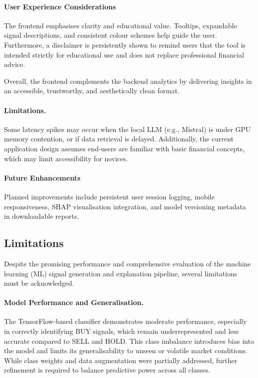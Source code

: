 \FloatBarrier

\paragraph{User Experience Considerations}
The frontend emphasises clarity and educational value. Tooltips, expandable signal descriptions, and consistent colour schemes help guide the user. Furthermore, a disclaimer is persistently shown to remind users that the tool is intended strictly for educational use and does not replace professional financial advice.

Overall, the frontend complements the backend analytics by delivering insights in an accessible, trustworthy, and aesthetically clean format.

\paragraph{Limitations.}  
Some latency spikes may occur when the local LLM (e.g., Mistral) is under GPU memory contention, or if data retrieval is delayed. Additionally, the current application design assumes end-users are familiar with basic financial concepts, which may limit accessibility for novices.

\paragraph{Future Enhancements}  
Planned improvements include persistent user session logging, mobile responsiveness, SHAP visualisation integration, and model versioning metadata in downloadable reports.

\subsection{Limitations}

Despite the promising performance and comprehensive evaluation of the machine learning (ML) signal generation and explanation pipeline, several limitations must be acknowledged.

\paragraph{Model Performance and Generalisation.}  
The TensorFlow-based classifier demonstrates moderate performance, especially in correctly identifying BUY signals, which remain underrepresented and less accurate compared to SELL and HOLD. This class imbalance introduces bias into the model and limits its generalisability to unseen or volatile market conditions. While class weights and data augmentation were partially addressed, further refinement is required to balance predictive power across all classes.

